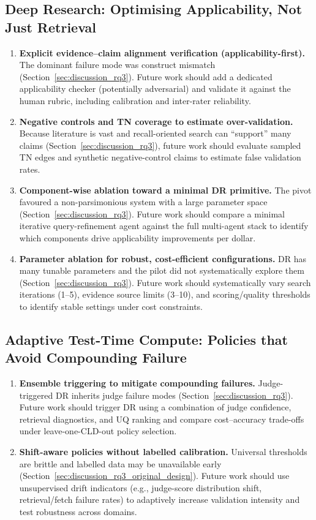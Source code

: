 \subsection{Deep Research: Optimising Applicability, Not Just Retrieval}
\begin{enumerate}[noitemsep]
    \item \textbf{Explicit evidence--claim alignment verification (applicability-first).} The dominant failure mode was construct mismatch (Section~\ref{sec:discussion_rq3}). Future work should add a dedicated applicability checker (potentially adversarial) and validate it against the human rubric, including calibration and inter-rater reliability.
    \item \textbf{Negative controls and TN coverage to estimate over-validation.} Because literature is vast and recall-oriented search can ``support'' many claims (Section~\ref{sec:discussion_rq3}), future work should evaluate sampled TN edges and synthetic negative-control claims to estimate false validation rates.
    \item \textbf{Component-wise ablation toward a minimal DR primitive.} The pivot favoured a non-parsimonious system with a large parameter space (Section~\ref{sec:discussion_rq3}). Future work should compare a minimal iterative query-refinement agent against the full multi-agent stack to identify which components drive applicability improvements per dollar.
    \item \textbf{Parameter ablation for robust, cost-efficient configurations.} DR has many tunable parameters and the pilot did not systematically explore them (Section~\ref{sec:discussion_rq3}). Future work should systematically vary search iterations (1--5), evidence source limits (3--10), and scoring/quality thresholds to identify stable settings under cost constraints.
\end{enumerate}

\subsection{Adaptive Test-Time Compute: Policies that Avoid Compounding Failure}
\begin{enumerate}[noitemsep]
    \item \textbf{Ensemble triggering to mitigate compounding failures.} Judge-triggered DR inherits judge failure modes (Section~\ref{sec:discussion_rq3}). Future work should trigger DR using a combination of judge confidence, retrieval diagnostics, and UQ ranking and compare cost--accuracy trade-offs under leave-one-CLD-out policy selection.
    \item \textbf{Shift-aware policies without labelled calibration.} Universal thresholds are brittle and labelled data may be unavailable early (Section~\ref{sec:discussion_rq3_original_design}). Future work should use unsupervised drift indicators (e.g., judge-score distribution shift, retrieval/fetch failure rates) to adaptively increase validation intensity and test robustness across domains.
\end{enumerate}


